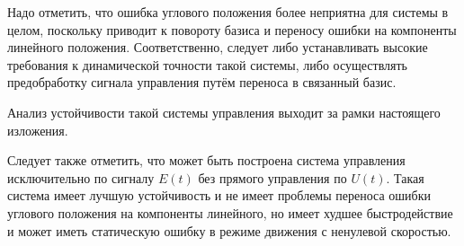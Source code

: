 Надо отметить, что ошибка углового положения более неприятна для системы в целом, поскольку приводит к повороту базиса и переносу ошибки на компоненты линейного положения. Соответственно, следует либо устанавливать высокие требования к динамической точности такой системы, либо осуществлять предобработку сигнала управления путём переноса в связанный базис. 

Анализ устойчивости такой системы управления выходит за рамки настоящего изложения.

Следует также отметить, что может быть построена система управления исключительно по сигналу $E(t)$ без прямого управления по $U(t)$. Такая система имеет лучшую устойчивость и не имеет проблемы переноса ошибки углового положения на компоненты линейного, но имеет худшее быстродействие и может иметь статическую ошибку в режиме движения с ненулевой скоростью.